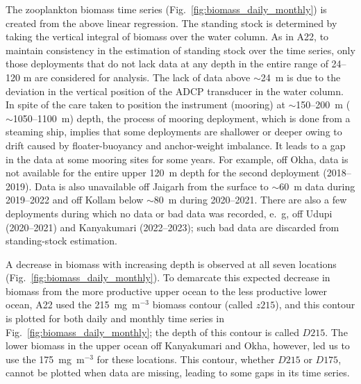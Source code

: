 \documentclass[authoryear,review,11pt]{elsarticle}
\begin{document}

The zooplankton biomass time series (Fig.~\ref{fig:biomass_daily_monthly}) is created from the above linear regression. The standing stock is determined by taking the vertical integral of biomass over the water column. As in A22, to maintain consistency in the estimation of standing stock over the time series, only those deployments that do not lack data at any depth in the entire range of 24--120 m are considered for analysis. The lack of data above $\sim$24~m is due to the deviation in the vertical position of the ADCP transducer in the water column. In spite of the care taken to position the instrument (mooring) at  $\sim$150--200~m ($\sim$1050--1100~m) depth, the process of mooring deployment, which is done from a steaming ship, implies that some deployments are shallower or deeper owing to drift caused by floater-buoyancy and anchor-weight imbalance. It leads to a gap in the data at some mooring sites for some years. For example, off Okha, data is not available for the entire upper 120~m depth for the second deployment (2018--2019). Data is also unavailable off Jaigarh from the surface to $\sim$60~m data during 2019--2022 and off Kollam below $\sim$80~m during 2020--2021. There are also a few deployments during which no data or bad data was recorded, e.~g, off Udupi (2020--2021) and Kanyakumari (2022--2023); such bad data are discarded from standing-stock estimation. 	

A decrease in biomass with increasing depth is observed at all seven locations (Fig.~\ref{fig:biomass_daily_monthly}).  To demarcate this expected decrease in biomass from the more productive upper ocean to the less productive lower ocean, A22 used the 215~mg~m$^{-3}$ biomass contour (called $z215$), and this contour is plotted for both daily and monthly time series in Fig.~\ref{fig:biomass_daily_monthly}; the depth of this contour is called $D215$.  The lower biomass in the upper ocean off Kanyakumari and Okha, however, led us to use the 175~mg~m$^{-3}$ for these locations.  This contour, whether $D215$ or $D175$, cannot be plotted when data are missing, leading to some gaps in its time series.  

\end{document}
